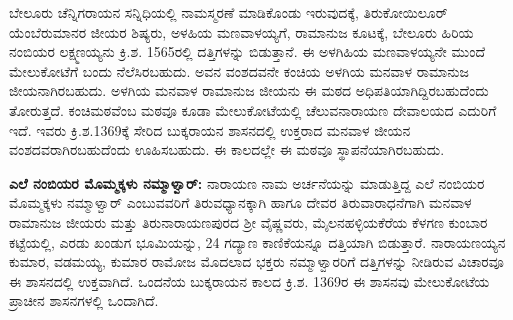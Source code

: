 ಬೇಲೂರು ಚೆನ್ನಿಗರಾಯನ ಸನ್ನಿಧಿಯಲ್ಲಿ ನಾಮಸ್ಮರಣೆ ಮಾಡಿಕೊಂಡು ಇರುವುದಕ್ಕೆ, ತಿರುಕೋಯಿಲೂರ್​\break ಯೆಂಬೆರುಮಾನರ ಜೀಯರ ಶಿಷ್ಯರು, ಅಳಹಿಯ ಮಣವಾಳಯ್ಯಗೆ, ರಾಮಾನುಜ ಕೂಟಕ್ಕೆ, ಬೇಲೂರು ಹಿರಿಯ ನಂಬಿಯರ ಲಕ್ಷ್ಮಣಯ್ಯನು ಕ್ರಿ.ಶ. 1565ರಲ್ಲಿ ದತ್ತಿಗಳನ್ನು ಬಿಡುತ್ತಾನೆ. ಈ ಅಳಗಿಹಿಯ ಮಣವಾಳಯ್ಯನೇ ಮುಂದೆ ಮೇಲುಕೋಟೆಗೆ ಬಂದು ನೆಲೆಸಿರ\-ಬಹುದು. ಅವನ ವಂಶದವನೇ ಕಂಚಿಯ ಅಳಗಿಯ ಮನವಾಳ ರಾಮಾನುಜ ಜೀಯನಾಗಿರಬಹುದು. ಅಳಗಿಯ ಮನವಾಳ ರಾಮಾನುಜ ಜೀಯನು ಈ ಮಠದ ಅಧಿಪತಿಯಾಗಿದ್ದಿರಬಹುದೆಂದು ತೋರುತ್ತದೆ. ಕಂಚಿಮಠವೆಂಬ ಮಠವೂ ಕೂಡಾ ಮೇಲುಕೋಟೆಯಲ್ಲಿ ಚೆಲುವನಾರಾಯಣ ದೇವಾಲಯದ ಎದುರಿಗೆ ಇದೆ. ಇವರು ಕ್ರಿ.ಶ.1369ಕ್ಕೆ ಸೇರಿದ ಬುಕ್ಕರಾಯನ ಶಾಸನದಲ್ಲಿ ಉಕ್ತರಾದ ಮನವಾಳ ಜೀಯನ ವಂಶದವರಾಗಿರಬಹುದೆಂದು ಊಹಿಸಬಹುದು. ಈ ಕಾಲದಲ್ಲೇ ಈ ಮಠವೂ ಸ್ಥಾಪನೆಯಾಗಿರಬಹುದು.

\textbf{ಎಲೆ ನಂಬಿಯರ ಮೊಮ್ಮಕ್ಕಳು ನಮ್ಮಾಳ್ವಾರ್​:} ನಾರಾಯಣ ನಾಮ ಅರ್ಚನೆಯನ್ನು ಮಾಡುತ್ತಿದ್ದ ಎಲೆ ನಂಬಿಯರ ಮೊಮ್ಮಕ್ಕಳು ನಮ್ಮಾಳ್ವಾರ್​ ಎಂಬುವವರಿಗೆ ತಿರುವಧ್ಯಾನಕ್ಕಾಗಿ ಹಾಗೂ ದೇವರ ತಿರುವಾರಾಧನೆಗಾಗಿ ಮನವಾಳ ರಾಮಾನುಜ ಜೀಯರು ಮತ್ತು ತಿರುನಾರಾಯಣಪುರದ ಶ‍್ರೀ ವೈಷ್ಣವರು, ಮೈಲನಹಳ್ಳಿಯಕೆರೆಯ ಕೆಳಗಣ ಕುಂಬಾರ ಕಟ್ಟೆಯಲ್ಲಿ, ಎರಡು ಖಂಡುಗ ಭೂಮಿಯನ್ನು, 24 ಗದ್ಯಾಣ ಕಾಣಿಕೆಯನ್ನೂ ದತ್ತಿಯಾಗಿ ಬಿಡುತ್ತಾರೆ. ನಾರಾಯಣಯ್ಯನ ಕುಮಾರ, ವಡಮಯ್ಯ, ಕುಮಾರ ರಾಮೋಜ ಮೊದಲಾದ ಭಕ್ತರು ನಮ್ಮಾಳ್ವಾರರಿಗೆ ದತ್ತಿಗಳನ್ನು ನೀಡಿರುವ ವಿಚಾರವೂ ಈ ಶಾಸನದಲ್ಲಿ ಉಕ್ತವಾಗಿದೆ. ಒಂದನೆಯ ಬುಕ್ಕರಾಯನ ಕಾಲದ ಕ್ರಿ.ಶ. 1369ರ ಈ ಶಾಸನವು ಮೇಲುಕೋಟೆಯ ಪ್ರಾಚೀನ ಶಾಸನಗಳಲ್ಲಿ ಒಂದಾಗಿದೆ.

